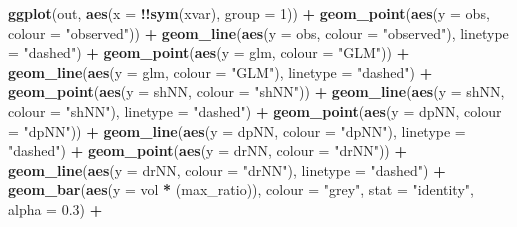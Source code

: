\documentclass[
]{article}
\newenvironment{Shaded}{\begin{snugshade}}{\end{snugshade}}
\newcommand{\AttributeTok}[1]{\textcolor[rgb]{0.13,0.29,0.53}{#1}}
\newcommand{\DecValTok}[1]{\textcolor[rgb]{0.00,0.00,0.81}{#1}}
\newcommand{\FloatTok}[1]{\textcolor[rgb]{0.00,0.00,0.81}{#1}}
\newcommand{\FunctionTok}[1]{\textcolor[rgb]{0.13,0.29,0.53}{\textbf{#1}}}
\newcommand{\NormalTok}[1]{#1}
\newcommand{\SpecialCharTok}[1]{\textcolor[rgb]{0.81,0.36,0.00}{\textbf{#1}}}
\newcommand{\StringTok}[1]{\textcolor[rgb]{0.31,0.60,0.02}{#1}}
\begin{document}
\begin{Shaded}
\begin{Highlighting}[]
  \FunctionTok{ggplot}\NormalTok{(out, }\FunctionTok{aes}\NormalTok{(}\AttributeTok{x =} \SpecialCharTok{!!}\FunctionTok{sym}\NormalTok{(xvar), }\AttributeTok{group =} \DecValTok{1}\NormalTok{)) }\SpecialCharTok{+}
    \FunctionTok{geom\_point}\NormalTok{(}\FunctionTok{aes}\NormalTok{(}\AttributeTok{y =}\NormalTok{ obs, }\AttributeTok{colour =} \StringTok{"observed"}\NormalTok{)) }\SpecialCharTok{+} \FunctionTok{geom\_line}\NormalTok{(}\FunctionTok{aes}\NormalTok{(}\AttributeTok{y =}\NormalTok{ obs, }\AttributeTok{colour =} \StringTok{"observed"}\NormalTok{), }\AttributeTok{linetype =} \StringTok{"dashed"}\NormalTok{) }\SpecialCharTok{+}
    \FunctionTok{geom\_point}\NormalTok{(}\FunctionTok{aes}\NormalTok{(}\AttributeTok{y =}\NormalTok{ glm, }\AttributeTok{colour =} \StringTok{"GLM"}\NormalTok{)) }\SpecialCharTok{+} \FunctionTok{geom\_line}\NormalTok{(}\FunctionTok{aes}\NormalTok{(}\AttributeTok{y =}\NormalTok{ glm, }\AttributeTok{colour =} \StringTok{"GLM"}\NormalTok{), }\AttributeTok{linetype =} \StringTok{"dashed"}\NormalTok{) }\SpecialCharTok{+}
    \FunctionTok{geom\_point}\NormalTok{(}\FunctionTok{aes}\NormalTok{(}\AttributeTok{y =}\NormalTok{ shNN, }\AttributeTok{colour =} \StringTok{"shNN"}\NormalTok{)) }\SpecialCharTok{+} \FunctionTok{geom\_line}\NormalTok{(}\FunctionTok{aes}\NormalTok{(}\AttributeTok{y =}\NormalTok{ shNN, }\AttributeTok{colour =} \StringTok{"shNN"}\NormalTok{), }\AttributeTok{linetype =} \StringTok{"dashed"}\NormalTok{) }\SpecialCharTok{+}
    \FunctionTok{geom\_point}\NormalTok{(}\FunctionTok{aes}\NormalTok{(}\AttributeTok{y =}\NormalTok{ dpNN, }\AttributeTok{colour =} \StringTok{"dpNN"}\NormalTok{)) }\SpecialCharTok{+} \FunctionTok{geom\_line}\NormalTok{(}\FunctionTok{aes}\NormalTok{(}\AttributeTok{y =}\NormalTok{ dpNN, }\AttributeTok{colour =} \StringTok{"dpNN"}\NormalTok{), }\AttributeTok{linetype =} \StringTok{"dashed"}\NormalTok{) }\SpecialCharTok{+}
    \FunctionTok{geom\_point}\NormalTok{(}\FunctionTok{aes}\NormalTok{(}\AttributeTok{y =}\NormalTok{ drNN, }\AttributeTok{colour =} \StringTok{"drNN"}\NormalTok{)) }\SpecialCharTok{+} \FunctionTok{geom\_line}\NormalTok{(}\FunctionTok{aes}\NormalTok{(}\AttributeTok{y =}\NormalTok{ drNN, }\AttributeTok{colour =} \StringTok{"drNN"}\NormalTok{), }\AttributeTok{linetype =} \StringTok{"dashed"}\NormalTok{) }\SpecialCharTok{+}
    \FunctionTok{geom\_bar}\NormalTok{(}\FunctionTok{aes}\NormalTok{(}\AttributeTok{y =}\NormalTok{ vol }\SpecialCharTok{*}\NormalTok{ (max\_ratio)), }\AttributeTok{colour =} \StringTok{"grey"}\NormalTok{, }\AttributeTok{stat =} \StringTok{"identity"}\NormalTok{, }\AttributeTok{alpha =} \FloatTok{0.3}\NormalTok{) }\SpecialCharTok{+}

\end{Highlighting}
\end{Shaded}
\end{document}
